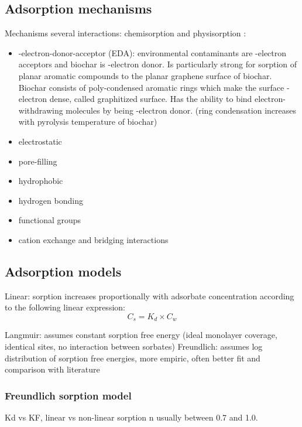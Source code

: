 \citep{Li2019} 

\subsection{Adsorption mechanisms}

Mechanisms
several interactions: chemisorption and physisorption \citep{Li2019}:
\begin{itemize}
    \item \textpi-\textpi electron-donor-acceptor (EDA): environmental contaminants are \textpi-electron acceptors and biochar is \textpi-electron donor. Is particularly strong for sorption of planar aromatic compounds to the planar graphene surface of biochar. Biochar consists of poly-condensed aromatic rings which make the surface \textpi-electron dense, called graphitized surface. Has the ability to bind electron-withdrawing molecules by being \textpi-electron donor. (ring condensation increases with pyrolysis temperature of biochar)
    \item electrostatic
    \item pore-filling
    \item hydrophobic
    \item hydrogen bonding
    \item functional groups
    \item cation exchange and bridging interactions
\end{itemize} 

\subsection{Adsorption models}
Linear: sorption increases proportionally with adsorbate concentration according to the following linear expression:
\begin{equation}\label{linear}
C_s = K_d \times C_w
\end{equation}

Langmuir: assumes constant sorption free energy (ideal monolayer coverage, identical sites, no interaction between sorbates)
Freundlich: assumes log distribution of sorption free energies, more empiric, often better fit and comparison with literature


\subsubsection{Freundlich sorption model}
Kd vs KF, linear vs non-linear sorption
n usually between 0.7 and 1.0. 

